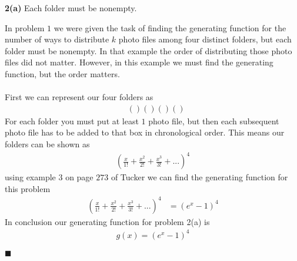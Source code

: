 \documentclass[12pt]{article}
\renewcommand{\qed}{\hfill$\blacksquare$}
\begin{document}
\noindent\textbf{2(a)} Each folder must be nonempty.\\
\begin{addmargin}[1em]{1em}
    In problem $1$ we were given the task of finding the generating function for the number of ways to distribute $k$ photo files among four distinct folders, but each folder must be nonempty. In that example the order of distributing those photo files did not matter. However, in this example we must find the generating function, but the order matters.\\\\
    First we can represent our four folders as 
    \begin{align*}
        &()()()()
    \end{align*}
    For each folder you must put at least $1$ photo file, but then each subsequent photo file has to be added to that box in chronological order. This means our folders can be shown as
    \begin{align*}
        (\frac{x}{1!} + \frac{x^2}{2!} + \frac{x^3}{3!} + ...)^4
    \end{align*}
    using example $3$ on page $273$ of Tucker we can find the generating function for this problem
    \begin{align*}
        (\frac{x}{1!} + \frac{x^2}{2!} + \frac{x^3}{3!} + ...)^4 &= (e^x-1)^4
    \end{align*}
    In conclusion our generating function for problem 2(a) is 
    \begin{align*}
        g(x) = (e^x-1)^4
    \end{align*}
    \begin{flushright}
    \qed
    \end{flushright}
\end{addmargin}
\end{document}
